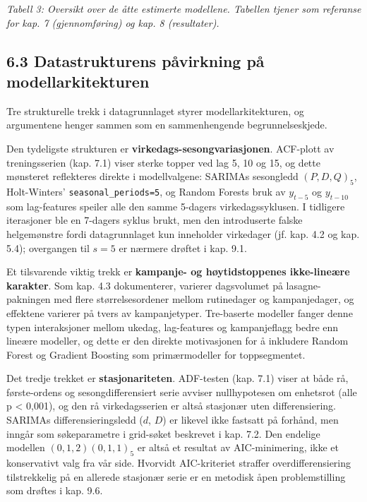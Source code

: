 \documentclass[
  norsk,
  11pt,
  a4paper,
]{article}
\begin{document}
{\centering\small

\emph{Tabell 3: Oversikt over de åtte estimerte modellene. Tabellen
tjener som referanse for kap. 7 (gjennomføring) og kap. 8 (resultater).}

\par}

\subsection{6.3 Datastrukturens påvirkning på
modellarkitekturen}\label{datastrukturens-puxe5virkning-puxe5-modellarkitekturen}

Tre strukturelle trekk i datagrunnlaget styrer modellarkitekturen, og
argumentene henger sammen som en sammenhengende begrunnelseskjede.

Den tydeligste strukturen er \textbf{virkedags-sesongvariasjonen}.
ACF-plott av treningsserien (kap. 7.1) viser sterke topper ved lag 5, 10
og 15, og dette mønsteret reflekteres direkte i modellvalgene: SARIMAs
sesongledd \((P,D,Q)_5\), Holt-Winters' \texttt{seasonal\_periods=5}, og
Random Forests bruk av \(y_{t-5}\) og \(y_{t-10}\) som lag-features
speiler alle den samme 5-dagers virkedagssyklusen. I tidligere
iterasjoner ble en 7-dagers syklus brukt, men den introduserte falske
helgemønstre fordi datagrunnlaget kun inneholder virkedager (jf. kap.
4.2 og kap. 5.4); overgangen til \(s=5\) er nærmere drøftet i kap. 9.1.

Et tilsvarende viktig trekk er \textbf{kampanje- og høytidstoppenes
ikke-lineære karakter}. Som kap. 4.3 dokumenterer, varierer dagsvolumet
på lasagne-pakningen med flere størrelsesordener mellom rutinedager og
kampanjedager, og effektene varierer på tvers av kampanjetyper.
Tre-baserte modeller fanger denne typen interaksjoner mellom ukedag,
lag-features og kampanjeflagg bedre enn lineære modeller, og dette er
den direkte motivasjonen for å inkludere Random Forest og Gradient
Boosting som primærmodeller for toppsegmentet.

Det tredje trekket er \textbf{stasjonariteten}. ADF-testen (kap. 7.1)
viser at både rå, første-ordens og sesongdifferensiert serie avviser
nullhypotesen om enhetsrot (alle p \textless{} 0,001), og den rå
virkedagsserien er altså stasjonær uten differensiering. SARIMAs
differensieringsledd (\(d\), \(D\)) er likevel ikke fastsatt på forhånd,
men inngår som søkeparametre i grid-søket beskrevet i kap. 7.2. Den
endelige modellen \((0,1,2)(0,1,1)_5\) er altså et resultat av
AIC-minimering, ikke et konservativt valg fra vår side. Hvorvidt
AIC-kriteriet straffer overdifferensiering tilstrekkelig på en allerede
stasjonær serie er en metodisk åpen problemstilling som drøftes i kap.
9.6.
\end{document}

